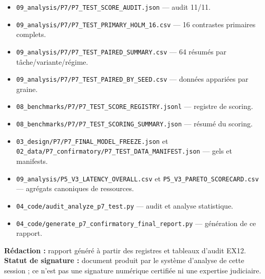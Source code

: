 \documentclass[
]{article}
\providecommand{\tightlist}{%
  \setlength{\itemsep}{0pt}\setlength{\parskip}{0pt}}
\begin{document}
\begin{itemize}
\tightlist
\item
  \texttt{09\_analysis/P7/P7\_TEST\_SCORE\_AUDIT.json} --- audit 11/11.
\item
  \texttt{09\_analysis/P7/P7\_TEST\_PRIMARY\_HOLM\_16.csv} --- 16
  contrastes primaires complets.
\item
  \texttt{09\_analysis/P7/P7\_TEST\_PAIRED\_SUMMARY.csv} --- 64 résumés
  par tâche/variante/régime.
\item
  \texttt{09\_analysis/P7/P7\_TEST\_PAIRED\_BY\_SEED.csv} --- données
  appariées par graine.
\item
  \texttt{08\_benchmarks/P7/P7\_TEST\_SCORE\_REGISTRY.jsonl} ---
  registre de scoring.
\item
  \texttt{08\_benchmarks/P7/P7\_TEST\_SCORING\_SUMMARY.json} --- résumé
  du scoring.
\item
  \texttt{03\_design/P7/P7\_FINAL\_MODEL\_FREEZE.json} et
  \texttt{02\_data/P7\_confirmatory/P7\_TEST\_DATA\_MANIFEST.json} ---
  gels et manifests.
\item
  \texttt{09\_analysis/P5\_V3\_LATENCY\_OVERALL.csv} et
  \texttt{P5\_V3\_PARETO\_SCORECARD.csv} --- agrégats canoniques de
  ressources.
\item
  \texttt{04\_code/audit\_analyze\_p7\_test.py} --- audit et analyse
  statistique.
\item
  \texttt{04\_code/generate\_p7\_confirmatory\_final\_report.py} ---
  génération de ce rapport.
\end{itemize}

\textbf{Rédaction :} rapport généré à partir des registres et tableaux
d'audit EX12. \textbf{Statut de signature :} document produit par le
système d'analyse de cette session ; ce n'est pas une signature
numérique certifiée ni une expertise judiciaire.
\end{document}
